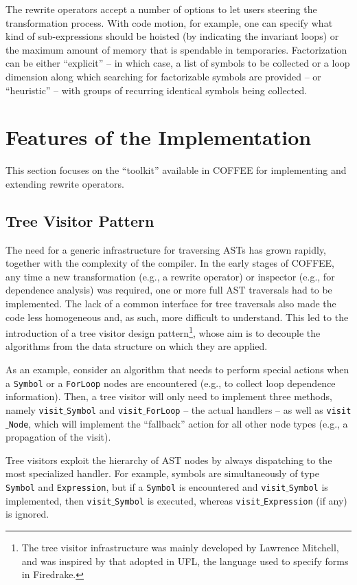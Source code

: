 The rewrite operators accept a number of options to let users steering the transformation process. With code motion, for example, one can specify what kind of sub-expressions should be hoisted (by indicating the invariant loops) or the maximum amount of memory that is spendable in temporaries. Factorization can be either ``explicit'' -- in which case, a list of symbols to be collected or a loop dimension along which searching for factorizable symbols are provided -- or ``heuristic'' -- with groups of recurring identical symbols being collected.

\section{Features of the Implementation}
This section focuses on the ``toolkit'' available in COFFEE for implementing and extending rewrite operators.

\subsection{Tree Visitor Pattern}
The need for a generic infrastructure for traversing ASTs has grown rapidly, together with the complexity of the compiler. In the early stages of COFFEE, any time a new transformation (e.g., a rewrite operator) or inspector (e.g., for dependence analysis) was required, one or more full AST traversals had to be implemented. The lack of a common interface for tree traversals also made the code less homogeneous and, as such, more difficult to understand. This led to the introduction of a tree visitor design pattern\footnote{The tree visitor infrastructure was mainly developed by Lawrence Mitchell, and was inspired by that adopted in UFL, the language used to specify forms in Firedrake.}, whose aim is to decouple the algorithms from the data structure on which they are applied. 

As an example, consider an algorithm that needs to perform special actions when a \texttt{Symbol} or a \texttt{ForLoop} nodes are encountered (e.g., to collect loop dependence information). Then, a tree visitor will only need to implement three methods, namely \texttt{visit$\_$Symbol} and \texttt{visit$\_$ForLoop} -- the actual handlers -- as well as \texttt{visit$\_$Node}, which will implement the ``fallback'' action for all other node types (e.g., a propagation of the visit).

Tree visitors exploit the hierarchy of AST nodes by always dispatching to the most specialized handler. For example, symbols are simultaneously of type \texttt{Symbol} and \texttt{Expression}, but if a \texttt{Symbol} is encountered and \texttt{visit$\_$Symbol} is implemented, then \texttt{visit$\_$Symbol} is executed, whereas \texttt{visit$\_$Expression} (if any) is ignored.

